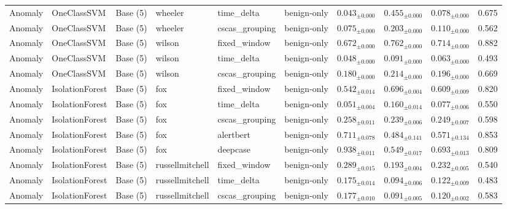 \begin{longtable}{llllllcccc}
\addlinespace
Anomaly & OneClassSVM & Base (5) & wheeler & time\_delta & benign-only & $0.043_{\pm 0.000}$ & $0.455_{\pm 0.000}$ & $0.078_{\pm 0.000}$ & 0.675 \\
\addlinespace
Anomaly & OneClassSVM & Base (5) & wheeler & cscas\_grouping & benign-only & $0.075_{\pm 0.000}$ & $0.203_{\pm 0.000}$ & $0.110_{\pm 0.000}$ & 0.562 \\
\addlinespace
Anomaly & OneClassSVM & Base (5) & wilson & fixed\_window & benign-only & $0.672_{\pm 0.000}$ & $0.762_{\pm 0.000}$ & $0.714_{\pm 0.000}$ & 0.882 \\
\addlinespace
Anomaly & OneClassSVM & Base (5) & wilson & time\_delta & benign-only & $0.048_{\pm 0.000}$ & $0.091_{\pm 0.000}$ & $0.063_{\pm 0.000}$ & 0.493 \\
\addlinespace
Anomaly & OneClassSVM & Base (5) & wilson & cscas\_grouping & benign-only & $0.180_{\pm 0.000}$ & $0.214_{\pm 0.000}$ & $0.196_{\pm 0.000}$ & 0.669 \\
\addlinespace
Anomaly & IsolationForest & Base (5) & fox & fixed\_window & benign-only & $0.542_{\pm 0.014}$ & $0.696_{\pm 0.004}$ & $0.609_{\pm 0.009}$ & 0.820 \\
\addlinespace
Anomaly & IsolationForest & Base (5) & fox & time\_delta & benign-only & $0.051_{\pm 0.004}$ & $0.160_{\pm 0.014}$ & $0.077_{\pm 0.006}$ & 0.550 \\
\addlinespace
Anomaly & IsolationForest & Base (5) & fox & cscas\_grouping & benign-only & $0.258_{\pm 0.011}$ & $0.239_{\pm 0.006}$ & $0.249_{\pm 0.007}$ & 0.598 \\
\addlinespace
Anomaly & IsolationForest & Base (5) & fox & alertbert & benign-only & $0.711_{\pm 0.078}$ & $0.484_{\pm 0.141}$ & $0.571_{\pm 0.134}$ & 0.853 \\
\addlinespace
Anomaly & IsolationForest & Base (5) & fox & deepcase & benign-only & $0.938_{\pm 0.011}$ & $0.549_{\pm 0.017}$ & $0.693_{\pm 0.013}$ & 0.809 \\
\addlinespace
Anomaly & IsolationForest & Base (5) & russellmitchell & fixed\_window & benign-only & $0.289_{\pm 0.015}$ & $0.193_{\pm 0.004}$ & $0.232_{\pm 0.005}$ & 0.540 \\
\addlinespace
Anomaly & IsolationForest & Base (5) & russellmitchell & time\_delta & benign-only & $0.175_{\pm 0.014}$ & $0.094_{\pm 0.006}$ & $0.122_{\pm 0.009}$ & 0.483 \\
\addlinespace
Anomaly & IsolationForest & Base (5) & russellmitchell & cscas\_grouping & benign-only & $0.177_{\pm 0.010}$ & $0.091_{\pm 0.005}$ & $0.120_{\pm 0.002}$ & 0.583 \\

\end{longtable}
